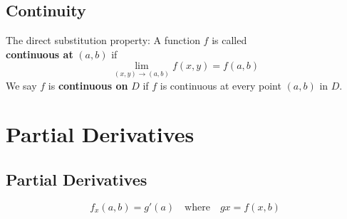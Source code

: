 \documentclass{report}  %
\begin{document}
\subsection*{Continuity} 
The direct substitution property: A function $f$ is called \\
\textbf{continuous at} $(a, b)$ if 
\begin{equation}
	\lim_{(x,y) \to (a,b)} f(x, y) = f(a, b)
\end{equation}
We say $f$ is \textbf{continuous on} $D$ if $f$ is continuous at every point $(a, b)$ in $D$. 

\newpage

\section{Partial Derivatives}
\subsection*{Partial Derivatives}
\begin{equation}
	f_x (a, b) = g'(a) \quad \text{where} \quad g{x} = f(x, b)
\end{equation}	
\end{document}

